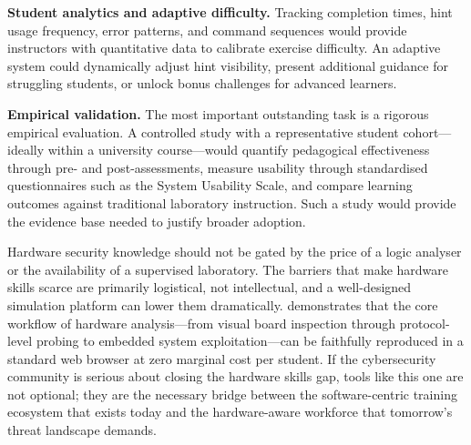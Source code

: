 \textbf{Student analytics and adaptive difficulty.} Tracking completion times, hint usage frequency, error patterns, and command sequences would provide instructors with quantitative data to calibrate exercise difficulty. An adaptive system could dynamically adjust hint visibility, present additional guidance for struggling students, or unlock bonus challenges for advanced learners.

\textbf{Empirical validation.} The most important outstanding task is a rigorous empirical evaluation. A controlled study with a representative student cohort---ideally within a university course---would quantify pedagogical effectiveness through pre- and post-assessments, measure usability through standardised questionnaires such as the System Usability Scale, and compare learning outcomes against traditional laboratory instruction. Such a study would provide the evidence base needed to justify broader adoption.

\bigskip

Hardware security knowledge should not be gated by the price of a logic analyser or the availability of a supervised laboratory. The barriers that make hardware skills scarce are primarily logistical, not intellectual, and a well-designed simulation platform can lower them dramatically. \pcbctf{} demonstrates that the core workflow of hardware analysis---from visual board inspection through protocol-level probing to embedded system exploitation---can be faithfully reproduced in a standard web browser at zero marginal cost per student. If the cybersecurity community is serious about closing the hardware skills gap, tools like this one are not optional; they are the necessary bridge between the software-centric training ecosystem that exists today and the hardware-aware workforce that tomorrow's threat landscape demands.
